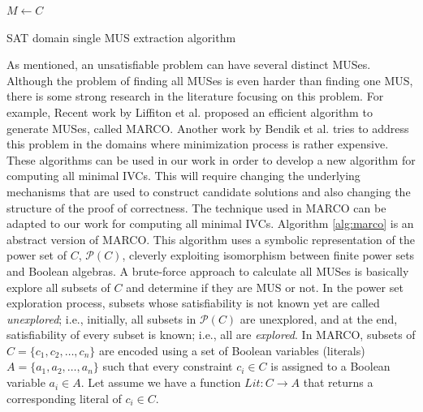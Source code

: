 \begin{algorithm}[t]
  \BlankLine
  $M \leftarrow C$\\
   {
  }
\caption{SAT domain single MUS extraction algorithm}
\label{alg:mus}
\end{algorithm}

As mentioned, an unsatisfiable problem can have several distinct MUSes. Although the problem of finding all MUSes is even harder than finding one MUS, there is some strong research in the literature focusing on this problem. For example, Recent work by Liffiton et al. \cite{marco2016fast} proposed an efficient algorithm to generate MUSes, called MARCO.
Another work by Bendik et al. \cite{bendk16} tries to address this problem in the domains where minimization process is rather expensive.
These algorithms can be used in our work in order to develop a new algorithm for computing all minimal IVCs. This will require changing the underlying mechanisms that are used to construct candidate solutions and also changing the structure of the proof of correctness. The technique used in MARCO can be adapted to our work for computing all minimal IVCs. Algorithm \ref{alg:marco} is an abstract version of MARCO. This algorithm uses a symbolic representation of the
power set of $C$, $\mathcal{P} (C)$,  cleverly exploiting isomorphism between finite power sets
and Boolean algebras.
A brute-force approach to calculate all MUSes is basically explore all subsets of $C$ and determine if they are MUS or not. In the power set exploration process, subsets whose satisfiability is not known
yet are called \emph{unexplored}; i.e., initially, all subsets in $\mathcal{P} (C)$ are unexplored, and at the end, satisfiability of every subset is known; i.e., all are \emph{explored}.
In MARCO, subsets of
 $C = \{c_1 ,c_2 , \dots ,c_n \}$ are encoded using a set of Boolean variables (literals)
$A = \{a_1 ,a_2 , \dots, a_n \}$ such that every constraint $c_i \in C$ is assigned to a Boolean variable $a_i \in A$. Let assume we have a function $Lit: C \rightarrow A$ that returns a corresponding literal of $c_i \in C$.

